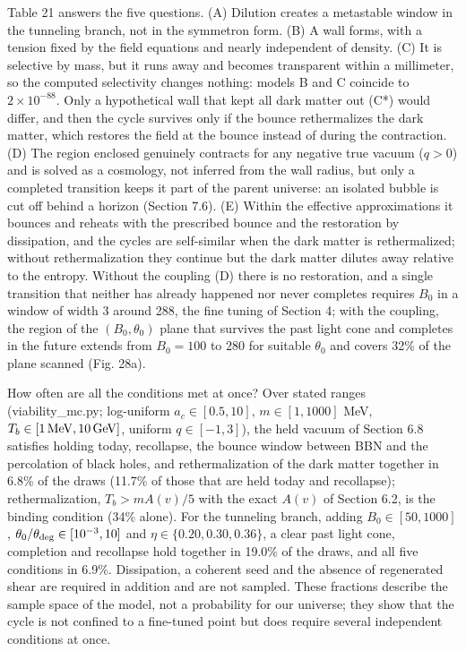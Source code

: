 \documentclass[11pt,a4paper]{article}
\begin{document}
Table 21 answers the five questions. (A) Dilution creates a metastable window in the tunneling branch, not in the symmetron form. (B) A wall forms, with a tension fixed by the field equations and nearly independent of density. (C) It is selective by mass, but it runs away and becomes transparent within a millimeter, so the computed selectivity changes nothing: models B and C coincide to $2\times10^{-88}$. Only a hypothetical wall that kept all dark matter out (C*) would differ, and then the cycle survives only if the bounce rethermalizes the dark matter, which restores the field at the bounce instead of during the contraction. (D) The region enclosed genuinely contracts for any negative true vacuum ($q>0$) and is solved as a cosmology, not inferred from the wall radius, but only a completed transition keeps it part of the parent universe: an isolated bubble is cut off behind a horizon (Section 7.6). (E) Within the effective approximations it bounces and reheats with the prescribed bounce and the restoration by dissipation, and the cycles are self-similar when the dark matter is rethermalized; without rethermalization they continue but the dark matter dilutes away relative to the entropy. Without the coupling (D) there is no restoration, and a single transition that neither has already happened nor never completes requires $B_0$ in a window of width 3 around 288, the fine tuning of Section 4; with the coupling, the region of the $(B_0,\theta_0)$ plane that survives the past light cone and completes in the future extends from $B_0=100$ to $280$ for suitable $\theta_0$ and covers 32\% of the plane scanned (Fig. 28a).

How often are all the conditions met at once? Over stated ranges (viability\_mc.py; log-uniform $a_c\in[0.5,10]$, $m\in[1,1000]$ MeV, $T_b\in[1\,{\rm MeV},10\,{\rm GeV}]$, uniform $q\in[-1,3]$), the held vacuum of Section 6.8 satisfies holding today, recollapse, the bounce window between BBN and the percolation of black holes, and rethermalization of the dark matter together in 6.8\% of the draws (11.7\% of those that are held today and recollapse); rethermalization, $T_b>mA(v)/5$ with the exact $A(v)$ of Section 6.2, is the binding condition (34\% alone). For the tunneling branch, adding $B_0\in[50,1000]$, $\theta_0/\theta_{\rm deg}\in[10^{-3},10]$ and $\eta\in\{0.20,0.30,0.36\}$, a clear past light cone, completion and recollapse hold together in 19.0\% of the draws, and all five conditions in 6.9\%. Dissipation, a coherent seed and the absence of regenerated shear are required in addition and are not sampled. These fractions describe the sample space of the model, not a probability for our universe; they show that the cycle is not confined to a fine-tuned point but does require several independent conditions at once.
\end{document}
